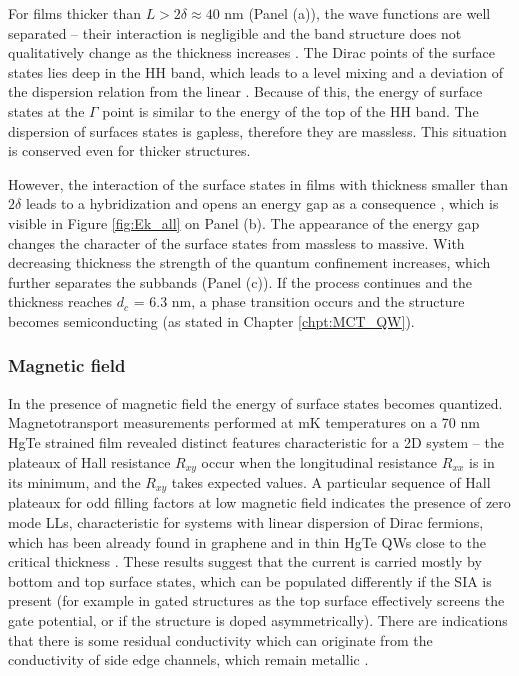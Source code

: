 \documentclass[titlepage,a4paper]{book}
\newcommand{\wciecie}{\quad\phantom{v}}
\begin{document}
For films thicker than $L > 2\delta \approx 40$ nm (Panel (a)), the wave functions are well separated -- their interaction is negligible and the band structure does not qualitatively change as the thickness increases \cite{Baum_MCT_layers}. The Dirac points of the surface states lies deep in the HH band, which leads to a level mixing and a deviation of the dispersion relation from the linear \cite{Ganichev_MCT_layers}. Because of this, the energy of surface states at the $\Gamma$ point is similar to the energy of the top of the HH band. The dispersion of surfaces states is gapless, therefore they are massless. This situation is conserved even for thicker structures. 

However, the interaction of the surface states in films with thickness smaller than $2\delta$ leads to a hybridization and opens an energy gap as a consequence \cite{Baum_MCT_layers}, which is visible in Figure \ref{fig:Ek_all} on Panel (b). The appearance of the energy gap changes the character of the surface states from massless to massive. With decreasing thickness the strength of the quantum confinement increases, which further separates the subbands (Panel (c)). If the process continues and the thickness reaches $d_c$ = 6.3 nm, a phase transition occurs and the structure becomes semiconducting (as stated in Chapter \ref{chpt:MCT_QW}). 

\subsubsection{Magnetic field}
\wciecie
In the presence of magnetic field the energy of surface states becomes quantized. Magnetotransport measurements performed at mK temperatures \cite{Brune_State2} on a 70 nm HgTe strained film revealed distinct features characteristic for a 2D system -- the plateaux of Hall resistance $R_{xy}$ occur when the longitudinal resistance $R_{xx}$ is in its minimum, and the $R_{xy}$ takes expected values. A particular sequence of Hall plateaux for odd filling factors at low magnetic field indicates the presence of zero mode LLs, characteristic for systems with linear dispersion of Dirac fermions, which has been already found in graphene \cite{Castro_graphene} and in thin HgTe QWs close to the critical thickness \cite{Zholudev_MCT_QW}. These results suggest that the current is carried mostly by bottom and top surface states, which can be populated differently if the SIA is present (for example in gated structures as the top surface effectively screens the gate potential, or if the structure is doped asymmetrically). There are indications that there is some residual conductivity which can originate from the conductivity of side edge channels, which remain metallic \cite{Chu_MCT_layers}. 
\end{document}
